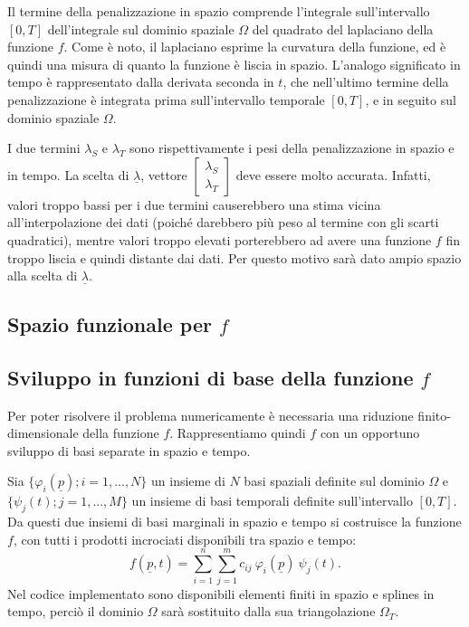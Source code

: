\documentclass[a4paper,11pt,twoside,openright]{book}							%
\begin{document}
Il termine della penalizzazione in spazio comprende l'integrale sull'intervallo $[0,T]$ dell'integrale sul dominio spaziale $\Omega$ del quadrato del laplaciano della funzione $f$. Come è noto, il laplaciano esprime la curvatura della funzione, ed è quindi una misura di quanto la funzione è liscia in spazio. L'analogo significato in tempo è rappresentato dalla derivata seconda in $t$, che nell'ultimo termine della penalizzazione è integrata prima sull'intervallo temporale $[0,T]$, e in seguito sul dominio spaziale $\Omega$.

I due termini $\lambda_S$ e $\lambda_T$ sono rispettivamente i pesi della penalizzazione in spazio e in tempo. La scelta di $\underline \lambda$, vettore $ \begin{bmatrix}
\lambda_S \\ \lambda_T
\end{bmatrix}$ deve essere molto accurata. Infatti, valori troppo bassi per i due termini causerebbero una stima vicina all'interpolazione dei dati (poiché darebbero più peso al termine con gli scarti quadratici), mentre valori troppo elevati porterebbero ad avere una funzione $f$ fin troppo liscia e quindi distante dai dati. Per questo motivo sarà dato ampio spazio alla scelta di $\underline \lambda$.

\subsection*{Spazio funzionale per $f$}

\subsection*{Sviluppo in funzioni di base della funzione $f$}

Per poter risolvere il problema numericamente è necessaria una riduzione finito-dimensionale della funzione $f$. Rappresentiamo quindi $f$ con un opportuno sviluppo di basi separate in spazio e tempo.

Sia $\{\varphi_i(\underline p); i=1, ... , N\}$ un insieme di $N$ basi spaziali definite sul dominio $\Omega$ e $\{\psi_j(t); j=1, ... , M\}$ un insieme di basi temporali definite sull'intervallo $[0,T]$. Da questi due insiemi di basi marginali in spazio e tempo si costruisce la funzione $f$, con tutti i prodotti incrociati disponibili tra spazio e tempo:
\begin{equation} 
\label{eq:basisexp}
f(\underline p,t)=\sum_{i=1}^n \sum_{j=1}^m c_{ij}\ \varphi_i(\underline p)\ \psi_j(t) .
\end{equation}
Nel codice implementato sono disponibili elementi finiti in spazio e splines in tempo, perciò il dominio $\Omega$ sarà sostituito dalla sua triangolazione $\Omega_T$.
\end{document}
